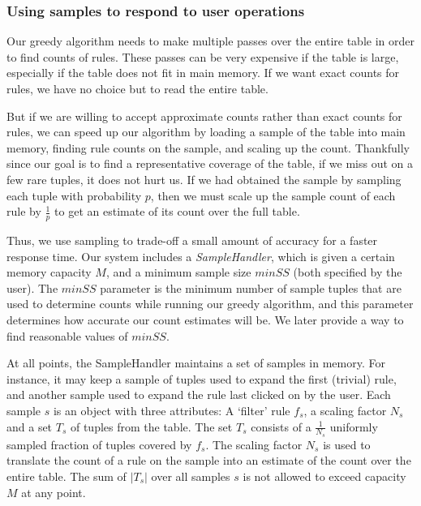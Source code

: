 \subsubsection{Using samples to respond to user operations}\label{sec:sample-using}
Our greedy algorithm needs to make multiple passes over the entire table in order to find counts of rules. These passes can be very expensive if the table is large, especially if the table does not fit in main memory. If we want exact counts for rules, we have no choice but to read the entire table. 

But if we are willing to accept approximate counts rather than exact counts for rules, we can speed up our algorithm by loading a sample of the table into main memory, finding rule counts on the sample, and scaling up the count. Thankfully since our goal is to find a representative coverage of the table,
if we miss out on a few rare tuples, it does not hurt us. If we had obtained the sample by sampling each tuple with probability $p$, then we must scale up the sample count of each rule by $\frac{1}{p}$ to get an estimate of its count over the full table. 

Thus, we use sampling to trade-off a small amount of accuracy for a faster response time. Our system includes a {\em SampleHandler}, which is given a certain memory capacity $M$, and a minimum sample size $minSS$ (both specified by the user).
The $minSS$ parameter is the minimum number of sample tuples that are used to determine counts while running our greedy algorithm, and this parameter determines how accurate our count estimates will be. We later provide a way to find reasonable values of $minSS$.

At all points, the SampleHandler maintains a set of samples in memory. For instance, it may keep a sample of tuples used to expand the first (trivial) rule, and another sample used to expand the rule last clicked on by the user. Each sample $s$ is an object with three attributes: A `filter' rule $f_s$, a scaling factor $N_s$ and a set $T_s$ of tuples from the table. The set $T_s$ consists of a $\frac{1}{N_s}$ uniformly sampled fraction of tuples covered by $f_s$. The scaling factor $N_s$ is used to translate the count of a rule on the sample into an estimate of the count over the entire table. The sum of $|T_s|$ over all samples $s$ is not allowed to exceed capacity $M$ at any point. 

